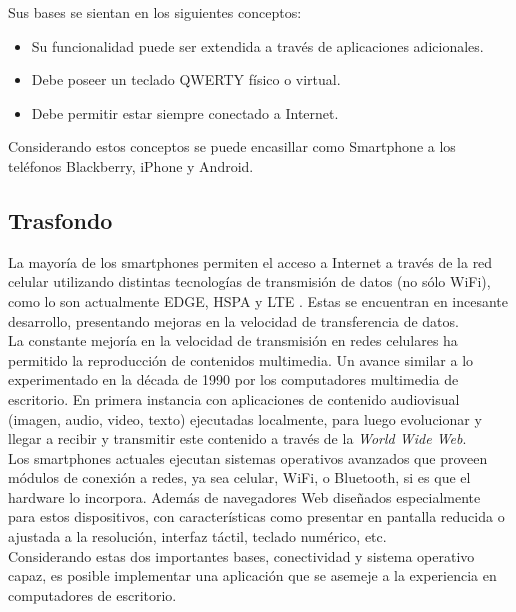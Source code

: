 Sus bases se sientan en los siguientes conceptos:
\begin{itemize}
\item Su funcionalidad puede ser extendida a través de aplicaciones adicionales.
\item Debe poseer un teclado QWERTY físico o virtual.
\item Debe permitir estar siempre conectado a Internet.
\end{itemize}
Considerando estos conceptos se puede encasillar como Smartphone a los teléfonos Blackberry, iPhone y Android.

\subsection{Trasfondo}
La mayoría de los smartphones permiten el acceso a Internet a través de la red celular utilizando distintas tecnologías de transmisión de datos (no sólo WiFi), como lo son actualmente EDGE, HSPA y LTE \cite{cap1:tecnologias-celulares}. Estas se encuentran en incesante desarrollo, presentando mejoras en la velocidad de transferencia de datos.\\

La constante mejoría en la velocidad de transmisión en redes celulares ha permitido la reproducción de contenidos multimedia. Un avance similar a lo experimentado en la década de 1990 por los computadores multimedia de escritorio. En primera instancia con aplicaciones de contenido audiovisual (imagen, audio, video, texto) ejecutadas localmente, para luego evolucionar y llegar a recibir y transmitir este contenido a través de la \textit{World Wide Web}.\\

Los smartphones actuales ejecutan sistemas operativos avanzados que proveen módulos de conexión  a redes, ya sea celular, WiFi, o Bluetooth, si es que el hardware lo incorpora. Además de navegadores Web diseñados especialmente para estos dispositivos, con características como presentar en pantalla reducida o ajustada a la resolución, interfaz táctil, teclado numérico, etc.\\

Considerando estas dos importantes bases, conectividad y sistema operativo capaz, es posible implementar una aplicación que se asemeje a la experiencia en computadores de escritorio.\\

